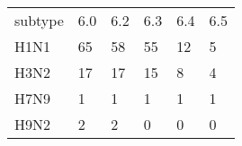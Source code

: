 \begin{tabular}{L{.75in}|L{.25in}|L{.60in}|L{.6in}|L{.6in}|L{.6in}}\hline
subtype&6.0&6.2&6.3&6.4&6.5\\
H1N1&65&58&55&12&5\\
H3N2&17&17&15&8&4\\
H7N9&1&1&1&1&1\\
H9N2&2&2&0&0&0\\
\hline\end{tabular}
